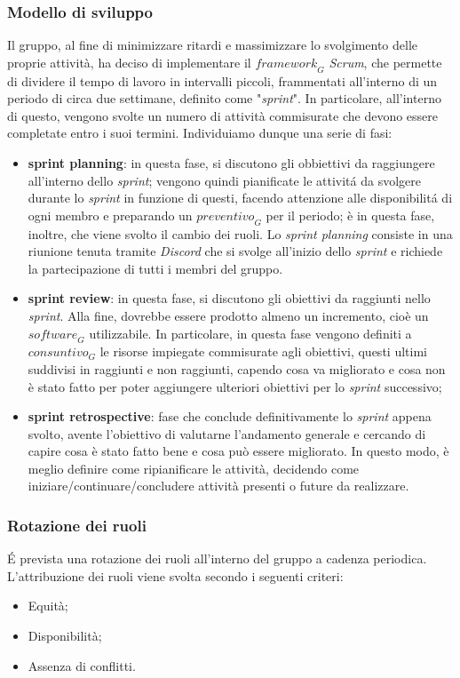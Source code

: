 \subsubsection{Modello di sviluppo}
Il gruppo, al fine di minimizzare ritardi e massimizzare lo svolgimento delle proprie attività, ha deciso
di implementare il $\textit{framework}_G$ \textit{Scrum}, che permette di dividere il tempo di lavoro in intervalli piccoli, frammentati all’interno di un periodo di circa due settimane, definito come "\textit{sprint}". In particolare, all’interno di
questo, vengono svolte un numero di attività commisurate che devono essere completate entro i suoi termini. Individuiamo dunque una serie di fasi:
\begin{itemize}
    \item \textbf{sprint planning}: in questa fase, si discutono gli obbiettivi da raggiungere all'interno dello \textit{sprint}; vengono quindi pianificate le attivitá da svolgere durante lo \textit{sprint} in funzione di questi, facendo attenzione alle disponibilitá di ogni membro e preparando un $\textit{preventivo}_G$ per il periodo; è in questa fase, inoltre, che viene svolto il cambio dei ruoli.
    Lo \textit{sprint planning} consiste in una riunione tenuta tramite \textit{Discord} che si svolge all'inizio dello \textit{sprint} e richiede la partecipazione di tutti i membri del gruppo.
    
    \item \textbf{sprint review}: in questa fase, si discutono gli obiettivi da raggiunti nello \textit{sprint}. Alla fine, dovrebbe essere prodotto almeno un incremento, cioè un $\textit{software}_G$ utilizzabile. In particolare, in questa fase vengono definiti a $\textit{consuntivo}_G$ le risorse impiegate commisurate agli obiettivi, questi ultimi suddivisi in raggiunti e non raggiunti, capendo cosa va migliorato e cosa non è stato fatto per poter aggiungere ulteriori obiettivi per lo \textit{sprint} successivo;
    
    \item \textbf{sprint retrospective}: fase che conclude definitivamente lo \textit{sprint} appena svolto, avente l'obiettivo di valutarne l'andamento generale e cercando di capire cosa è stato fatto bene e cosa può essere migliorato. In questo modo, è meglio definire come ripianificare le attività, decidendo come iniziare/continuare/concludere attività presenti o future da realizzare.
\end{itemize}

\subsubsection{Rotazione dei ruoli}
\'E prevista una rotazione dei ruoli all'interno del gruppo a cadenza periodica.
L’attribuzione dei ruoli viene svolta secondo i seguenti criteri:
\begin{itemize}
    \item Equità;
    \item Disponibilità;
    \item Assenza di conflitti.
\end{itemize}


